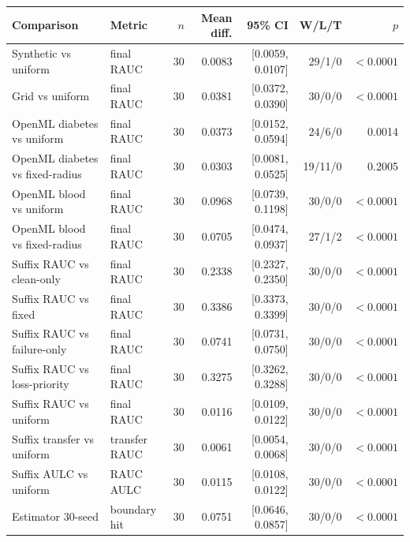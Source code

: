 \begin{tabular}{l l r r r r r}\hline
Comparison & Metric & $n$ & Mean diff. & 95\% CI & W/L/T & $p$ \\ \hline
Synthetic vs uniform & final RAUC & 30 & 0.0083 & [0.0059, 0.0107] & 29/1/0 & $<0.0001$ \\
Grid vs uniform & final RAUC & 30 & 0.0381 & [0.0372, 0.0390] & 30/0/0 & $<0.0001$ \\
OpenML diabetes vs uniform & final RAUC & 30 & 0.0373 & [0.0152, 0.0594] & 24/6/0 & 0.0014 \\
OpenML diabetes vs fixed-radius & final RAUC & 30 & 0.0303 & [0.0081, 0.0525] & 19/11/0 & 0.2005 \\
OpenML blood vs uniform & final RAUC & 30 & 0.0968 & [0.0739, 0.1198] & 30/0/0 & $<0.0001$ \\
OpenML blood vs fixed-radius & final RAUC & 30 & 0.0705 & [0.0474, 0.0937] & 27/1/2 & $<0.0001$ \\
Suffix RAUC vs clean-only & final RAUC & 30 & 0.2338 & [0.2327, 0.2350] & 30/0/0 & $<0.0001$ \\
Suffix RAUC vs fixed & final RAUC & 30 & 0.3386 & [0.3373, 0.3399] & 30/0/0 & $<0.0001$ \\
Suffix RAUC vs failure-only & final RAUC & 30 & 0.0741 & [0.0731, 0.0750] & 30/0/0 & $<0.0001$ \\
Suffix RAUC vs loss-priority & final RAUC & 30 & 0.3275 & [0.3262, 0.3288] & 30/0/0 & $<0.0001$ \\
Suffix RAUC vs uniform & final RAUC & 30 & 0.0116 & [0.0109, 0.0122] & 30/0/0 & $<0.0001$ \\
Suffix transfer vs uniform & transfer RAUC & 30 & 0.0061 & [0.0054, 0.0068] & 30/0/0 & $<0.0001$ \\
Suffix AULC vs uniform & RAUC AULC & 30 & 0.0115 & [0.0108, 0.0122] & 30/0/0 & $<0.0001$ \\
Estimator 30-seed & boundary hit & 30 & 0.0751 & [0.0646, 0.0857] & 30/0/0 & $<0.0001$ \\
\hline
\end{tabular}
